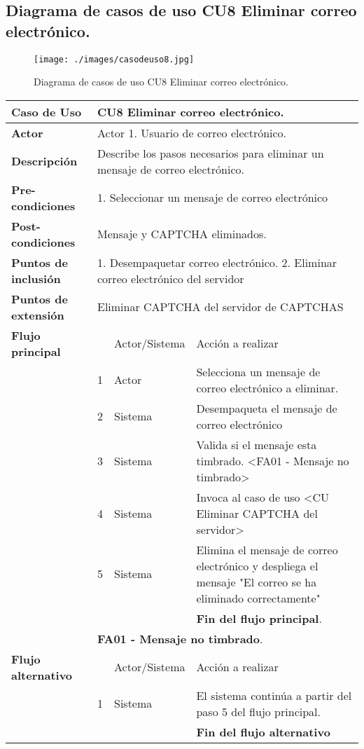 \documentclass[12pt,oneside,onecolumn,openany]{report}
\begin{document}
\pagebreak

\subsection{Diagrama de casos de uso CU8 Eliminar correo electrónico.}
\begin{figure}[H]
	\texttt{[image: ./images/casodeuso8.jpg]}
	\caption{Diagrama de casos de uso CU8 Eliminar correo electrónico.}
	\label{fig:4-9-1}
\end{figure}
\begin{table}[H]
 \centering
   {
     \begin{tabular}{| p{} | p{} |p{4cm}|p{5cm}|}
     \hline
     \textbf{Caso de Uso} &\multicolumn{3}{|l|}{CU8 Eliminar correo electrónico.}\\
     \hline
     \textbf{Actor} & \multicolumn{3}{|l|}{Actor 1. Usuario de correo electrónico.}\\
     \hline
     \textbf{Descripción} & \multicolumn{3}{|p{10cm}|}{Describe los pasos necesarios para eliminar un mensaje de correo electrónico.}\\
     \hline
     \textbf{Pre-condiciones} & \multicolumn{3}{|l|}{1. Seleccionar un mensaje de correo electrónico}\\
     \hline
     \textbf{Post-condiciones} & \multicolumn{3}{|l|}{Mensaje y CAPTCHA eliminados.}\\
     \hline
     \textbf{Puntos de inclusión} & \multicolumn{3}{|p{10cm}|}{1. Desempaquetar correo electrónico. 2. Eliminar correo electrónico del servidor}\\
     \hline
     \textbf{Puntos de extensión} & \multicolumn{3}{|l|}{Eliminar CAPTCHA del servidor de CAPTCHAS}\\
     \hline
     \textbf{Flujo principal} & & Actor/Sistema & Acción a realizar\\
     \hline
     & 1 & Actor & Selecciona un mensaje de correo electrónico a eliminar.\\
     \hline
     & 2 & Sistema & Desempaqueta el mensaje de correo electrónico\\
     \hline
     & 3 & Sistema & Valida si el mensaje esta timbrado. <FA01 - Mensaje no timbrado>\\
     \hline
     & 4 & Sistema & Invoca al caso de uso <CU Eliminar CAPTCHA del servidor>\\
     \hline
     & 5 & Sistema & Elimina el mensaje de correo electrónico y despliega el mensaje "El correo se ha eliminado correctamente"\\
     \hline
     & & & \textbf{Fin del flujo principal}.\\
     \hline
     & \multicolumn{3}{|l|}{\textbf{FA01 - Mensaje no timbrado}.}\\
     \hline
     \textbf{Flujo alternativo} & & Actor/Sistema & Acción a realizar\\
     \hline
     & 1 & Sistema & El sistema continúa a partir del paso 5 del flujo principal.\\
     \hline
     &  & & \textbf{Fin del flujo alternativo}\\
     

\end{tabular}}
\end{table}
\end{document}
